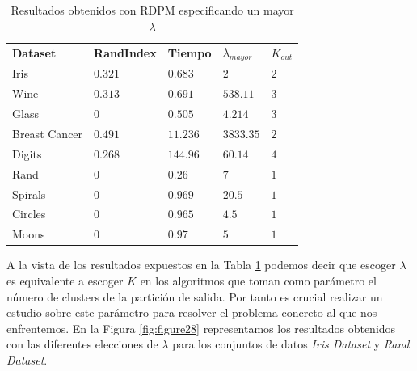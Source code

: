 \begin{table}[!h]
	\centering
	\setlength{\arrayrulewidth}{1mm}
	\setlength{\tabcolsep}{10pt}
	\renewcommand{\arraystretch}{0.85}
	
	\begin{tabular}{ >{\centering\arraybackslash}m{2.5cm}  >{\centering\arraybackslash}m{1.8cm}>{\centering\arraybackslash}m{1.5cm}>{\centering\arraybackslash}m{1cm}>{\centering\arraybackslash}m{1cm}}
		\hline
		\rowcolor{black}
		\multicolumn{5}{c}{\bf \color{white}{Resultados obtenidos con RDPM para un mayor $\lambda$}}\\
		\hline
		\rowcolor{gray!50}
		\textbf{Dataset} & \textbf{RandIndex} & \textbf{Tiempo} & \textbf{$\lambda_{mayor}$} & \textbf{$K_{out}$}  \\
		Iris & $0.321$ & $0.683$ & $2$ & $2$ \\
		Wine & $0.313$ & $0.691$ & $538.11$ & $3$ \\
		Glass & $0$ & $0.505$ & $4.214$ & $3$ \\
		Breast Cancer & $0.491$ & $11.236$ & $3833.35$ & $2$ \\
		Digits & $0.268$ & $144.96$ & $60.14$ & $4$ \\
		Rand & $0$ & $0.26$ & $7$ & $1$ \\
		Spirals & $0$ & $0.969$ & $20.5$ & $1$ \\
		Circles & $0$ & $0.965$ & $4.5$ & $1$  \\
		Moons & $0$ & $0.97$ & $5$ & $1$ \\
		\hline
		
	\end{tabular}
	\caption{Resultados obtenidos con \acs{RDPM} especificando un mayor $\lambda$}
	\label{tab:tabla11}
\end{table}

A la vista de los resultados expuestos en la Tabla \ref{tab:tabla11} podemos decir que escoger $\lambda$ es equivalente a escoger $K$ en los algoritmos que toman como parámetro el número de clusters de la partición de salida. Por tanto es crucial realizar un estudio sobre este parámetro para resolver el problema concreto al que nos enfrentemos. En la Figura \ref{fig:figure28} representamos los resultados obtenidos con las diferentes elecciones de $\lambda$ para los conjuntos de datos \textit{Iris Dataset} y \textit{Rand Dataset}. 

